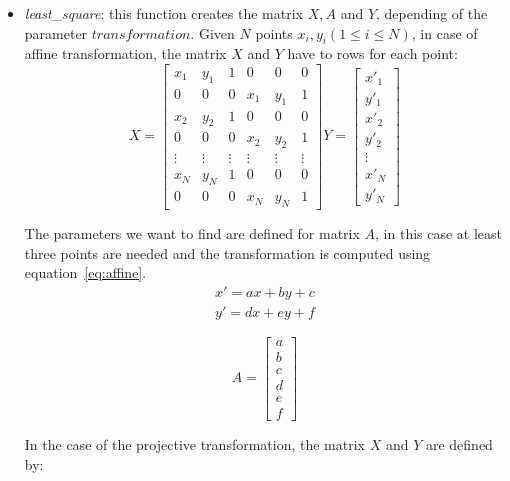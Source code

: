 \begin{itemize}
	\item \textit{least\_square}: this function creates the matrix $X,A$ and $Y$, depending of the parameter $transformation$. Given $N$ points $x_i, y_i (1\leq i\leq N ) $, in case of affine transformation, the matrix $X$ and $Y$ have to rows for each point:  
\[
X = 
\begin{bmatrix}
    x_{1}       & y_{1} & 1 & 0 & 0 & 0 \\
    0       & 0 & 0 & x_1 & y_1 & 1 \\
    x_{2}       & y_{2} & 1 & 0 & 0 & 0 \\
    0       & 0 & 0 & x_2 & y_2 & 1 \\
  \vdots & \vdots & \vdots & \vdots & \vdots & \vdots \\

    x_{N}       & y_{N} & 1 & 0 & 0 & 0 \\
    0       & 0 & 0 & x_N & y_N & 1 
\end{bmatrix}
%
Y = 
\begin{bmatrix}
    x'_{1} \\
    y'_{1} \\
    x'_{2}      \\
    y'_{2}   \\
 \vdots \\
    x'_{N}      \\
    y'_{N}   
\end{bmatrix}
\]

The parameters we want to find are defined for matrix $A$, in this case at least three points are needed and the transformation is computed using equation~\ref{eq:affine}.
\begin{equation}
\begin{split}
x'= ax+by+c \\
y'= dx+ey+f
\end{split}
\label{eq:affine}
\end{equation}

\[
A = 
\begin{bmatrix}
    a \\
    b \\
    c      \\
    d   \\ 
    e      \\
    f   
\end{bmatrix}
\]

In the case of the projective transformation, the matrix $X$ and $Y$ are defined by:


\end{itemize}
